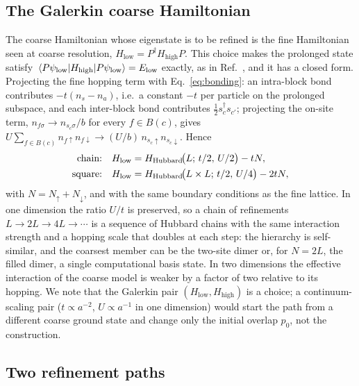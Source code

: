 \documentclass[
  aps,
  prc,
  reprint,
  superscriptaddress,
  floatfix,
  nofootinbib
]{revtex4-2}
\newcommand{\Hlow}{H_{\mathrm{low}}}
\newcommand{\Hhigh}{H_{\mathrm{high}}}
\begin{document}
\subsection{The Galerkin coarse Hamiltonian}
\label{sec:galerkin}
The coarse Hamiltonian whose eigenstate is to be refined is the fine
Hamiltonian seen at coarse resolution, $\Hlow=P^\dagger\Hhigh P$.  This
choice makes the prolonged state satisfy $\expval{\Hhigh}{P\psi_{\rm low}}
=E_{\rm low}$ exactly, as in Ref.~\cite{EigenQPairing2026}, and it has a
closed form.  Projecting the fine hopping term with Eq.~\eqref{eq:bonding}:
an intra-block bond contributes $-t(n_s-n_a)$, i.e.\ a constant $-t$ per
particle on the prolonged subspace, and each inter-block bond contributes
$\tfrac12 s^\dagger_c s_{c'}$; projecting the on-site term,
$n_{f\sigma}\to n_{s_c\sigma}/b$ for every $f\in B(c)$, gives
$U\sum_{f\in B(c)}n_{f\uparrow}n_{f\downarrow}\to(U/b)\,n_{s_c\uparrow}n_{s_c\downarrow}$.
Hence
\begin{align}
  \text{chain:}\quad &\Hlow=H_{\rm Hubbard}\!\big(L;\,t/2,\,U/2\big)-tN, \label{eq:gal1d}\\
  \text{square:}\quad&\Hlow=H_{\rm Hubbard}\!\big(L\times L;\,t/2,\,U/4\big)-2tN, \label{eq:gal2d}
\end{align}
with $N=N_\uparrow+N_\downarrow$, and with the same boundary conditions as the
fine lattice.  In one dimension the ratio $U/t$ is preserved, so a chain of
refinements $L\to2L\to4L\to\cdots$ is a sequence of Hubbard chains with the
same interaction strength and a hopping scale that doubles at each step: the
hierarchy is self-similar, and the coarsest member can be the two-site dimer
or, for $N=2L$, the filled dimer, a single computational basis state.  In
two dimensions the effective interaction of the coarse model is weaker by a
factor of two relative to its hopping.  We note that the Galerkin pair
$(\Hlow,\Hhigh)$ is a choice; a continuum-scaling pair ($t\propto a^{-2}$,
$U\propto a^{-1}$ in one dimension) would start the path from a different
coarse ground state and change only the initial overlap $p_0$, not the
construction.

\subsection{Two refinement paths}
\label{sec:paths}
\end{document}
